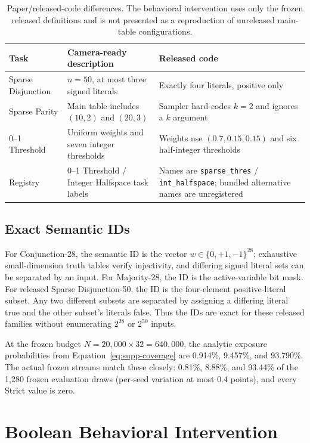 \begin{table}[H]
\caption{Paper/released-code differences.  The behavioral intervention uses
only the frozen released definitions and is not presented as a reproduction
of unreleased main-table configurations.}
\label{tab:boolean-mismatch}
\centering
\small
\setlength{\tabcolsep}{3.2pt}
\begin{tabular}{p{1.0in}p{2.3in}p{2.3in}}
\toprule
Task & Camera-ready description & Released code \\
\midrule
Sparse Disjunction &
$n=50$, at most three signed literals &
Exactly four literals, positive only \\
Sparse Parity &
Main table includes $(10,2)$ and $(20,3)$ &
Sampler hard-codes $k=2$ and ignores a $k$ argument \\
0--1 Threshold &
Uniform weights and seven integer thresholds &
Weights use $(0.7,0.15,0.15)$ and six half-integer thresholds \\
Registry &
0--1 Threshold / Integer Halfspace task labels &
Names are \texttt{sparse\_thres} / \texttt{int\_halfspace}; bundled
alternative names are unregistered \\
\bottomrule
\end{tabular}
\end{table}

\subsection{Exact Semantic IDs}

For Conjunction-28, the semantic ID is the vector
$w\in\{0,+1,-1\}^{28}$; exhaustive small-dimension truth tables verify
injectivity, and differing signed literal sets can be separated by an input.
For Majority-28, the ID is the active-variable bit mask.  For released Sparse
Disjunction-50, the ID is the four-element positive-literal subset.  Any two
different subsets are separated by assigning a differing literal true and
the other subset's literals false.  Thus the IDs are exact for these released
families without enumerating $2^{28}$ or $2^{50}$ inputs.

At the frozen budget $N=20{,}000\times32=640{,}000$, the analytic exposure
probabilities from Equation~\ref{eq:supp-coverage} are 0.914\%, 9.457\%, and
93.790\%.  The actual frozen streams match these closely: 0.81\%, 8.88\%, and
93.44\% of the 1,280 frozen evaluation draws (per-seed variation at most
0.4 points), and every Strict value is zero.

\section{Boolean Behavioral Intervention}

